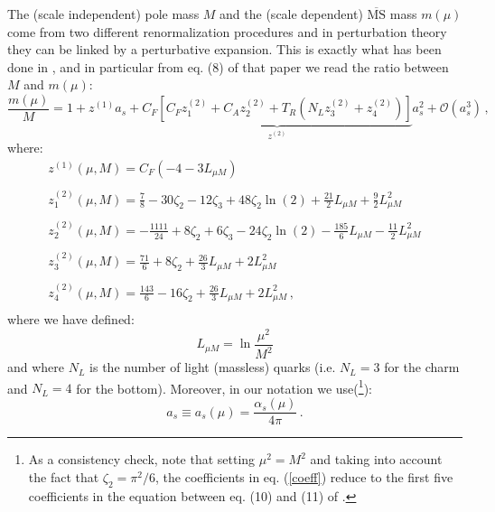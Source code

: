 \documentclass[10pt,a4paper]{article}
\begin{document}
The (scale independent) pole mass $M$ and the (scale dependent) $\overline{\mbox{MS}}$ mass $m(\mu)$ come from two different renormalization procedures and in perturbation theory they can be linked by a perturbative expansion. This is exactly what has been done in \cite{Chetyrkin:1999qi}, and in particular from eq. (8) of that paper we read the ratio between $M$ and $m(\mu)$:
\begin{equation}\label{straight}
\frac{m(\mu)}{M} = 1 + z^{(1)}a_s+\underbrace{C_F\left[C_Fz_1^{(2)}+C_Az_2^{(2)}+T_R\left(N_Lz_3^{(2)}+z_4^{(2)}\right)\right]}_{z^{(2)}}a_s^2+\mathcal{O}(a_s^3)\,,
\end{equation}
where:
\begin{equation}\label{coeff}
\begin{array}{l}
\displaystyle z^{(1)}(\mu,M) = C_F\left(- 4 - 3L_{\mu M}\right)\\
\\
\displaystyle z_{1}^{(2)}(\mu,M) = \frac{7}{8} - 30\zeta_2 - 12\zeta_3 + 48\zeta_2\ln(2) + \frac{21}2L_{\mu M} + \frac92 L_{\mu M}^2\\
\\
\displaystyle z_{2}^{(2)}(\mu,M) = -\frac{1111}{24} + 8\zeta_2 +6\zeta_3 - 24\zeta_2\ln(2) - \frac{185}6L_{\mu M} - \frac{11}2 L_{\mu M}^2\\
\\
\displaystyle z_{3}^{(2)}(\mu,M) = \frac{71}{6} + 8\zeta_2 + \frac{26}3L_{\mu M} + 2 L_{\mu M}^2\\
\\
\displaystyle z_{4}^{(2)}(\mu,M) = \frac{143}{6} -16\zeta_2 + \frac{26}3L_{\mu M} + 2 L_{\mu M}^2\,,\\
\end{array}
\end{equation}
where we have defined:
\begin{equation}
L_{\mu M} = \ln\frac{\mu^2}{M^2}
\end{equation}
and where $N_L$ is the number of light (massless) quarks (i.e. $N_L=3$ for the charm and $N_L=4$ for the bottom). Moreover, in our notation we use(\footnote{As a consistency check, note that setting $\mu^2=M^2$ and taking into account the fact that $\zeta_2 = \pi^2/6$, the coefficients in eq. (\ref{coeff}) reduce to the first five coefficients in the equation between eq. (10) and (11) of \cite{Melnikov:2000qh}.}):
\begin{equation}
a_s\equiv a_s(\mu) = \frac{\alpha_s(\mu)}{4\pi}\,.
\end{equation}
\end{document}
